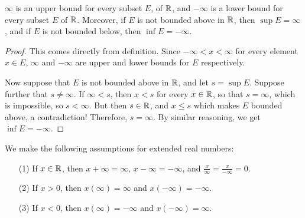 \begin{lemma}\label{theorem_1.3.5}
  $\infty$ is an upper bound for every subset  $E$, of  $\mathbb{R}$, and  $-\infty$ is
  a lower bound for every subset  $E$ of  $\mathbb{R}$. Moreover, if $E$ is not bounded
  above in $\mathbb{R}$, then  $\sup{E}=\infty$, and if  $E$ is not bounded below,
  then  $\inf{E}=-\infty$.
\end{lemma}
\begin{proof}
  This comes directly from definition. Since $-\infty<x<\infty$ for every
  element $x \in E$, $\infty$ and $-\infty$ are upper and lower bounds for $E$
  respectively.

  Now suppose that $E$ is not bounded above in $\mathbb{R}$, and let $s=\sup{E}$.
  Suppose further that $s \neq \infty$. If $\infty<s$, then $x<s$ for every $x
  \in \mathbb{R}$, so that $s=\infty$, which is impossible, so  $s<\infty$. But then  $s
  \in \mathbb{R}$, and $x \leq s$ which makes $E$ bounded above, a contradiction!
  Therefore,  $s=\infty$. By similar reasoning, we get $\inf{E}=-\infty$.
\end{proof}

\begin{remark}
  We make the following assumptions for extended real numbers:
  \begin{enumerate}
    \item[(1)] If $x \in \mathbb{R}$, then  $x+\infty=\infty$, $x-\infty=-\infty$,
      and $\frac{x}{\infty}=\frac{x}{-\infty}=0$.

    \item[(2)] If $x>0$, then  $x(\infty)=\infty$ and  $x(-\infty)=-\infty$.

    \item[(3)] If  $x<0$, then  $x(\infty)=-\infty$ and  $x(-\infty)=\infty$.
  \end{enumerate}
\end{remark}
